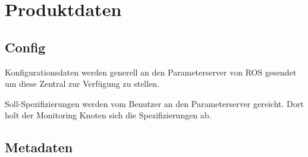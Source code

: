 \chapter{Produktdaten}

\section{Config}
\begin{description}
\item Konfigurationsdaten werden generell an den Parameterserver von ROS gesendet um diese Zentral zur Verfügung zu stellen.
\item Soll-Spezifizierungen werden vom Benutzer an den Parameterserver gereicht. Dort holt der Monitoring Knoten sich die Spezifizierungen ab.
\end{description}

\section{Metadaten}
